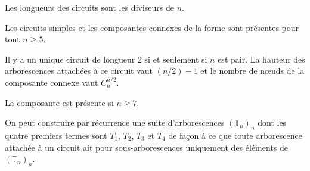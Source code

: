 \begin{conj}
Les longueurs des circuits sont les diviseurs de $n$.
\end{conj}

\begin{conj}
Les circuits simples et les composantes connexes de la forme  sont pr\'esentes pour tout $n\geqslant 5$.
\end{conj}

\begin{conj}
Il y a un unique circuit de longueur 2 si et seulement si $n$ est pair. La hauteur des arborescences attach\'ees \`a ce circuit vaut $(n/2) - 1$ et le nombre de n\oe uds de la composante connexe vaut $C^{n/2}_{n}$.
\end{conj}

\begin{conj}
La composante  est pr\'esente si $n\geqslant 7$.
\end{conj}

\begin{conj}
On peut construire par r\'ecurrence une suite d'arborescences $(\mathbb{T}_{n})_n$ dont les quatre premiers termes sont $T_1$, $T_2$, $T_3$ et $T_4$ de fa\c con \`a ce que toute arborescence attach\'ee \`a un circuit ait pour sous-arborescences uniquement des \'el\'ements de $(\mathbb{T}_{n})_n$.
\end{conj}